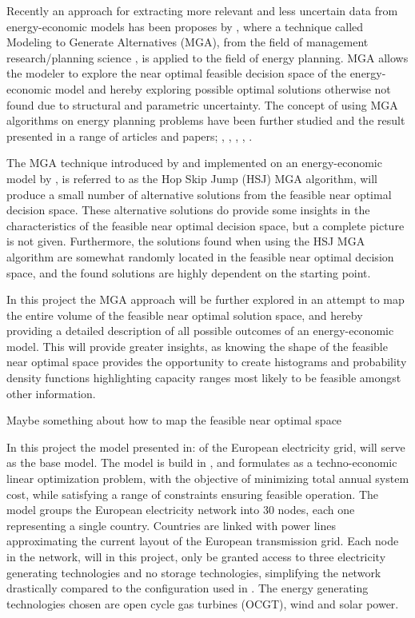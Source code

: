 Recently an approach for extracting more relevant and less uncertain data from energy-economic models has been proposes by \citeauthor{DeCarolis_MGA}, where a technique called Modeling to Generate Alternatives (MGA), from the field of management research/planning science \cite{Brill_MGA_1982}, is applied to the field of energy planning. MGA allows the modeler to explore the near optimal feasible decision space of the energy-economic model and hereby exploring possible optimal solutions otherwise not found due to structural and parametric uncertainty. The concept of using MGA algorithms on energy planning problems have been further studied and the result presented in a range of articles and papers; \cite{DECAROLIS2016}, \cite{MGA}, \cite{BERNTSEN2017886}, \cite{Yavuz2011}, \cite{Optimum_not_enough}.

The MGA technique introduced by \cite{Brill_MGA_1982} and implemented on an energy-economic model by \cite{DeCarolis_MGA}, is referred to as the Hop Skip Jump (HSJ) MGA algorithm, will produce a small number of alternative solutions from the feasible near optimal decision space.
These alternative solutions do provide some insights in the characteristics of the feasible near optimal decision space, but a complete picture is not given. Furthermore, the solutions found when using the HSJ MGA algorithm are somewhat randomly located in the feasible near optimal decision space, and the found solutions are highly dependent on the starting point. 

In this project the MGA approach will be further explored in an attempt to map the entire volume of the feasible near optimal solution space, and hereby providing a detailed description of all possible outcomes of an energy-economic model. This will provide greater insights, as knowing the shape of the feasible near optimal space provides the opportunity to create histograms and probability density functions highlighting capacity ranges most likely to be feasible amongst other information.

Maybe something about how to map the feasible near optimal space 

In this project the model presented in: \cite{PyPSA_euro_30_model} of the European electricity grid, will serve as the base model. The model is build in \cite{Pypsa}, and formulates as a techno-economic linear optimization problem, with the objective of minimizing total annual system cost, while satisfying a range of constraints ensuring feasible operation. The model groups the European electricity network into 30 nodes, each one representing a single country. Countries are linked with power lines approximating the current layout of the European transmission grid. Each node in the network, will in this project, only be granted access to three electricity generating technologies and no storage technologies, simplifying the network drastically compared to the configuration used in \cite{PyPSA_euro_30_model}. The energy generating technologies chosen are open cycle gas turbines (OCGT), wind and solar power.

